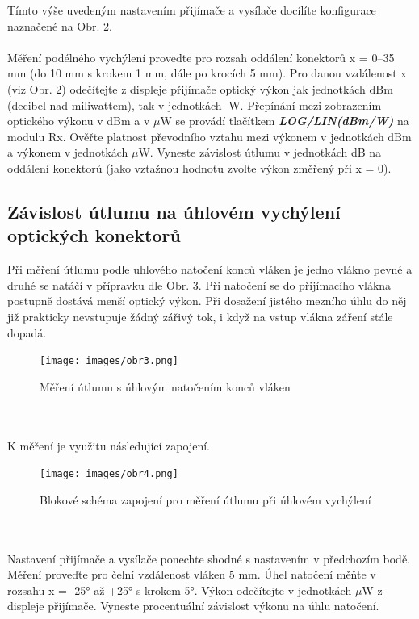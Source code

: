 Tímto výše uvedeným nastavením přijímače a vysílače docílíte konfigurace naznačené na Obr. 2.
\\\\
Měření podélného vychýlení proveďte pro rozsah oddálení konektorů x = 0–35 mm (do 10 mm s krokem 1 mm, dále po krocích 5 mm). Pro danou vzdálenost x (viz Obr. 2) odečítejte z displeje přijímače optický výkon jak jednotkách dBm (decibel nad miliwattem), tak v jednotkách W. Přepínání mezi zobrazením optického výkonu v dBm a v $\mu$W se provádí tlačítkem \textbf{\textit{LOG/LIN(dBm/W)}} na modulu Rx. Ověřte platnost převodního vztahu mezi výkonem v jednotkách dBm a výkonem v jednotkách $\mu$W. Vyneste závislost útlumu v jednotkách dB na oddálení konektorů (jako vztažnou hodnotu zvolte výkon změřený při x = 0).

\subsection{Závislost útlumu na úhlovém vychýlení optických konektorů}
Při měření útlumu podle uhlového natočení konců vláken je jedno vlákno pevné a druhé se natáčí v přípravku dle Obr. 3. Při natočení se do přijímacího vlákna postupně dostává menší optický výkon. Při dosažení jistého mezního úhlu do něj již prakticky nevstupuje žádný zářivý tok, i když na vstup vlákna záření stále dopadá.
\begin{figure}[h]
\centering
\texttt{[image: images/obr3.png]}
\caption{Měření útlumu s úhlovým natočením konců vláken}
\label{fig:3}
\end{figure}
\\\\
K měření je využitu následující zapojení.
\begin{figure}[h]
\centering
\texttt{[image: images/obr4.png]}
\caption{Blokové schéma zapojení pro měření útlumu při úhlovém vychýlení}
\label{fig:4}
\end{figure}
\\\\
Nastavení přijímače a vysílače ponechte shodné s nastavením v předchozím bodě. Měření proveďte pro čelní vzdálenost vláken 5 mm. Úhel natočení měňte v rozsahu x = -25° až +25° s krokem 5°. Výkon odečítejte v jednotkách $\mu$W z displeje přijímače. Vyneste procentuální závislost výkonu na úhlu natočení.
\newpage
